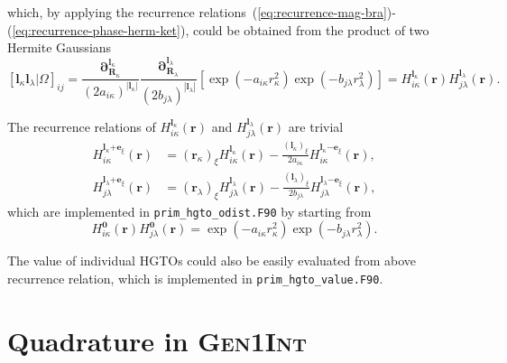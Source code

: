 \documentclass[a4paper,11pt,twoside,openright]{book}
\begin{document}
which, by applying the recurrence relations~(\ref{eq:recurrence-mag-bra})-(\ref{eq:recurrence-phase-herm-ket}),
could be obtained from the product of two Hermite Gaussians 
\begin{equation}
  \left[\boldsymbol{l}_{\kappa}\boldsymbol{l}_{\lambda}\Big|\Omega\right]_{ij}
  =\frac{\boldsymbol{\partial}_{\boldsymbol{R}_{\kappa}}^{\boldsymbol{l}_{\kappa}}}%
      {(2a_{i\kappa})^{|\boldsymbol{l}_{\kappa}|}}%
    \frac{\boldsymbol{\partial}_{\boldsymbol{R}_{\lambda}}^{\boldsymbol{l}_{\lambda}}}%
      {(2b_{j\lambda})^{|\boldsymbol{l}_{\lambda}|}}%
    \left[\exp(-a_{i\kappa}r_{\kappa}^2)\exp(-b_{j\lambda}r_{\lambda}^2)\right]%
  =H_{i\kappa}^{\boldsymbol{l}_{\kappa}}(\boldsymbol{r})H_{j\lambda}^{\boldsymbol{l}_{\lambda}}(\boldsymbol{r}).
\end{equation}

The recurrence relations of $H_{i\kappa}^{\boldsymbol{l}_{\kappa}}(\boldsymbol{r})$ and
$H_{j\lambda}^{\boldsymbol{l}_{\lambda}}(\boldsymbol{r})$ are trivial~\cite{Reine:PCCP9:4771}
\begin{align}
  H_{i\kappa}^{\boldsymbol{l}_{\kappa}\mathrm{+}\boldsymbol{e}_{\xi}}(\boldsymbol{r})
  &=(\boldsymbol{r}_{\kappa})_{\xi}H_{i\kappa}^{\boldsymbol{l}_{\kappa}}(\boldsymbol{r})%
  -\frac{(\boldsymbol{l}_{\kappa})_{\xi}}{2a_{i\kappa}}%
    H_{i\kappa}^{\boldsymbol{l}_{\kappa}\mathrm{-}\boldsymbol{e}_{\xi}}(\boldsymbol{r}),\\
  H_{j\lambda}^{\boldsymbol{l}_{\lambda}\mathrm{+}\boldsymbol{e}_{\xi}}(\boldsymbol{r})
  &=(\boldsymbol{r}_{\lambda})_{\xi}H_{j\lambda}^{\boldsymbol{l}_{\lambda}}(\boldsymbol{r})%
  -\frac{(\boldsymbol{l}_{\lambda})_{\xi}}{2b_{j\lambda}}%
    H_{j\lambda}^{\boldsymbol{l}_{\lambda}\mathrm{-}\boldsymbol{e}_{\xi}}(\boldsymbol{r}),
\end{align}
which are implemented in \verb|prim_hgto_odist.F90| by starting from
\begin{equation}
  H_{i\kappa}^{\boldsymbol{0}}(\boldsymbol{r})H_{j\lambda}^{\boldsymbol{0}}(\boldsymbol{r})%
    =\exp(-a_{i\kappa}r_{\kappa}^2)\exp(-b_{j\lambda}r_{\lambda}^2).
\end{equation}

The value of individual HGTOs could also be easily evaluated from above recurrence relation,
which is implemented in \verb|prim_hgto_value.F90|.

\section{Quadrature in \textsc{Gen1Int}}
\label{sect:quadrature}
\end{document}
